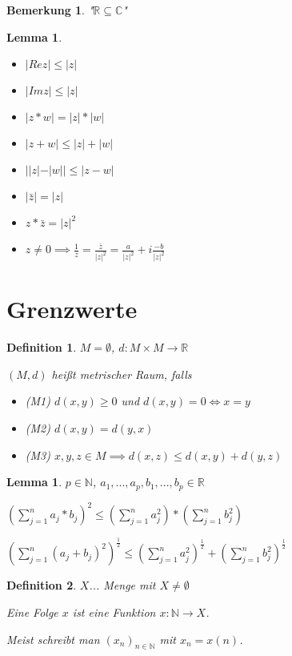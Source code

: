 \documentclass[twocolumn]{article}
\newtheorem{lemma}[theorem]{Lemma}
\newtheorem{definition}{Definition}[section]
\newtheorem*{remark}{Bemerkung}
\newcommand*{\logeq}{\Leftrightarrow}
\begin{document}
\begin{remark}
	"$\mathbb{R}\subseteq\mathbb{C}$"
\end{remark}

\begin{lemma}
	\begin{itemize}
		\item $|Rez|\leq |z|$
		\item $|Imz|\leq |z|$
		\item $|z*w|=|z|*|w|$
		\item $|z+w|\leq |z|+|w|$
		\item $||z|-|w||\leq |z-w|$
		\item $|\bar{z}|=|z|$
		\item $z*\bar{z}=|z|^{2}$
		\item $z\neq 0 \implies \frac{1}{z}=\frac{\bar{z}}{|z|^{2}}=\frac{a}{|z|^{2}}+i\frac{-b}{|z|^{2}}$
	\end{itemize}
\end{lemma}

\section{Grenzwerte}

\begin{definition}
	$M=\emptyset$, $d:M\times M \rightarrow \mathbb{R}$
	
	$(M,d)$ heißt metrischer Raum, falls
	
	\begin{itemize}
		\item (M1) $d(x,y)\geq 0$ und $d(x,y)=0\logeq x=y$
		\item (M2) $d(x,y)=d(y,x)$
		\item (M3) $x,y,z \in M \implies d(x,z) \leq d(x,y) + d(y,z)$
	\end{itemize}
\end{definition}

\begin{lemma}
	$p \in \mathbb{N}$, $a_{1},...,a_{p},b_{1},...,b_{p} \in \mathbb{R}$
	
	$(\sum_{j=1}^{n}a_{j}*b_{j})^{2}\leq(\sum_{j=1}^{n}a_{j}^{2})*(\sum_{j=1}^{n}b_{j}^{2})$
	
	$(\sum_{j=1}^{n}(a_{j}+b_{j})^{2})^{\frac{1}{2}} \leq (\sum_{j=1}^{n}a_{j}^{2})^{\frac{1}{2}}+(\sum_{j=1}^{n}b_{j}^{2})^{\frac{1}{2}}$
\end{lemma}

\begin{definition}
	$X$... Menge mit $X \neq \emptyset$
	
	Eine Folge $x$ ist eine Funktion $x:\mathbb{N}\rightarrow X$.
	
	Meist schreibt man $(x_{n})_{n \in \mathbb{N}}$ mit $x_{n}=x(n)$.
\end{definition}
\end{document}
